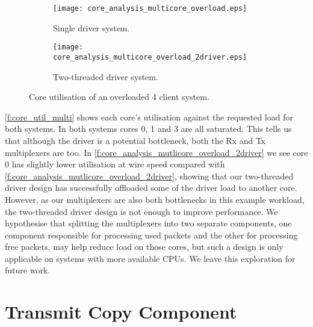 \noindent\begin{figure}[H]
    \centering
	\begin{multicols}{2}
	\begin{subfigure}[b]{0.45\textwidth}
        \centering
        \texttt{[image: core\_analysis\_multicore\_overload.eps]}
        \caption{Single driver system.}
        \label{f:core_analysis_mutlicore_overload}
    \end{subfigure}\qquad
    \begin{subfigure}[b]{0.45\textwidth}
        \centering
        \texttt{[image: core\_analysis\_multicore\_overload\_2driver.eps]}
        \caption{Two-threaded driver system.}
        \label{f:core_analysis_mutlicore_overload_2driver}
    \end{subfigure}
\end{multicols}
\caption{Core utilisation of an overloaded 4 client system.}
\label{f:core_util_multi}
\end{figure}

\autoref{f:core_util_multi} shows each core's utilisation against the requested load for both systems. 
In both systems cores 0, 1 and 3 are all saturated. This tells us that although the driver is a potential
bottleneck, both the Rx and Tx multiplexers are too. In \autoref{f:core_analysis_mutlicore_overload_2driver}
we see core 0 has slightly lower utilisation at wire speed compared with
\autoref{f:core_analysis_mutlicore_overload_2driver}, showing that our two-threaded driver design has successfully
offloaded some of the driver load to another core. However, as our multiplexers are also both bottlenecks in 
this example workload, the two-threaded driver design is not enough to improve performance. We hypothesise that
splitting the multiplexers into two separate components, one component responsible for processing used packets and 
the other for processing free packets, may help reduce load on those cores, but such a design is only applicable
on systems with more available CPUs. We leave this exploration for future work.

\section{Transmit Copy Component}

